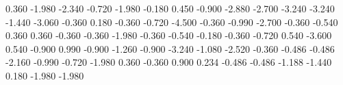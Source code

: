           {0.360}
         {-1.980}
         {-2.340}
         {-0.720}
         {-1.980}
         {-0.180}
          {0.450}
         {-0.900}
         {-2.880}
         {-2.700}
         {-3.240}
         {-3.240}
         {-1.440}
         {-3.060}
         {-0.360}
          {0.180}
         {-0.360}
         {-0.720}
         {-4.500}
         {-0.360}
         {-0.990}
         {-2.700}
         {-0.360}
         {-0.540}
          {0.360}
          {0.360}
         {-0.360}
         {-0.360}
         {-1.980}
         {-0.360}
         {-0.540}
         {-0.180}
         {-0.360}
      {-0.720}
        {0.540}
     {-3.600}
      {0.540}
     {-0.900}
     {0.990}
        {-0.900}
        {-1.260}
     {-0.900}
   {-3.240}
       {-1.080}
       {-2.520}
     {-0.360}
      {-0.486}
   {-0.486}
     {-2.160}
      {-0.990}
     {-0.720}
  {-1.980}
       {0.360}
     {-0.360}
     {0.900}
         {0.234}
        {-0.486}
        {-0.486}
        {-1.188}
     {-1.440}
     {0.180}
     {-1.980}
  {-1.980}
